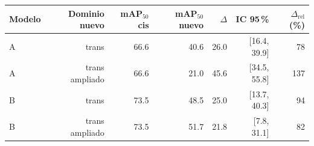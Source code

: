\begin{tabular}{lrrrrrr}
\toprule
Modelo & Dominio nuevo & mAP$_{50}$ cis & mAP$_{50}$ nuevo & $\Delta$ & IC 95\,\% & $\Delta_{\mathrm{rel}}$ (\%) \\
\midrule
A & trans & 66.6 & 40.6 & 26.0 & [16.4, 39.9] & 78 \\
A & trans ampliado & 66.6 & 21.0 & 45.6 & [34.5, 55.8] & 137 \\
B & trans & 73.5 & 48.5 & 25.0 & [13.7, 40.3] & 94 \\
B & trans ampliado & 73.5 & 51.7 & 21.8 & [7.8, 31.1] & 82 \\
\bottomrule
\end{tabular}
